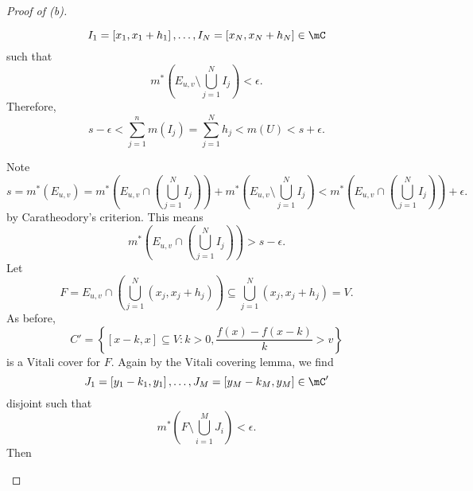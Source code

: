 \documentclass[pmath451]{subfiles}
\begin{document}
\begin{proof}[Proof of (b)]
\begin{claim}
\begin{equation*}
                I_1 = \left[ x_1,x_1+h_1 \right], \ldots, I_N = \left[ x_N, x_N+h_N \right]\in\mC
            \end{equation*}
            such that
            \begin{equation*}
                m^{*}\left( E_{u,v}\setminus \bigcup^{N}_{j=1}I_j \right) < \epsilon.
            \end{equation*}
            Therefore,
            \begin{equation*}
                s-\epsilon < \sum^{n}_{j=1} m\left( I_j \right) = \sum^{N}_{j=1} h_j < m\left( U \right) < s+\epsilon.
            \end{equation*}

            Note
            \begin{equation*}
                s = m^{*}\left( E_{u,v} \right) = m^{*}\left( E_{u,v}\cap\left( \bigcup^{N}_{j=1}I_j \right) \right) + m^{*}\left( E_{u,v}\setminus \bigcup^{N}_{j=1}I_j \right) < m^{*}\left( E_{u,v}\cap\left( \bigcup^{N}_{j=1}I_j \right) \right)+\epsilon.
            \end{equation*}
            by Caratheodory's criterion. This means
            \begin{equation*}
                m^{*}\left( E_{u,v}\cap\left( \bigcup^{N}_{j=1}I_j \right) \right) > s-\epsilon.
            \end{equation*}
            Let
            \begin{equation*}
                F = E_{u,v}\cap\left( \bigcup^{N}_{j=1}\left( x_j,x_j+h_j \right) \right)\subseteq \bigcup^{N}_{j=1}\left( x_j,x_j+h_j \right) = V.
            \end{equation*}
            As before,
            \begin{equation*}
                C' = \left\lbrace \left[ x-k,x \right]\subseteq V: k>0, \frac{f\left( x \right)-f\left( x-k \right)}{k}>v \right\rbrace
            \end{equation*}
            is a Vitali cover for $F$. Again by the Vitali covering lemma, we find
            \begin{equation*}
                J_1 = \left[ y_1-k_1,y_1 \right], \ldots, J_M = \left[ y_M-k_M,y_M \right]\in\mC'
            \end{equation*}
            disjoint such that
            \begin{equation*}
                m^{*}\left( F\setminus\bigcup^{M}_{i=1}J_i \right)<\epsilon.
            \end{equation*}
            Then

\end{claim}
\end{proof}
\end{document}
